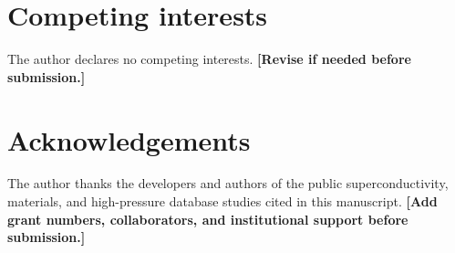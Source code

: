 \documentclass[11pt,a4paper]{article}
\begin{document}
\section*{Competing interests}

The author declares no competing interests. \textbf{[Revise if needed before submission.]}

\section*{Acknowledgements}

The author thanks the developers and authors of the public superconductivity, materials, and high-pressure database studies cited in this manuscript. \textbf{[Add grant numbers, collaborators, and institutional support before submission.]}
\end{document}
